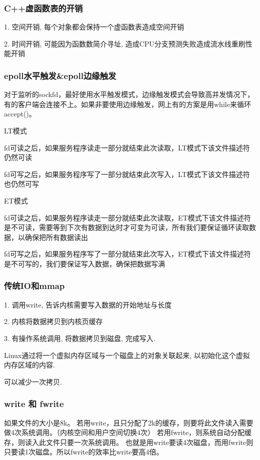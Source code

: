 \subsubsection{C++虚函数表的开销}
1. 空间开销, 每个对象都会保持一个虚函数表造成空间开销 \par
2. 时间开销, 可能因为函数数简介寻址, 造成CPU分支预测失败造成流水线重刷性能开销 \par
\subsubsection{epoll水平触发\&epoll边缘触发}
对于监听的sockfd，最好使用水平触发模式，边缘触发模式会导致高并发情况下，有的客户端会连接不上。如果非要使用边缘触发，网上有的方案是用while来循环accept()。 \par
LT模式 \par
fd可读之后，如果服务程序读走一部分就结束此次读取，LT模式下该文件描述符仍然可读\par
fd可写之后，如果服务程序写了一部分就结束此次写入，LT模式下该文件描述符也仍然可写\par
ET模式 \par
fd可读之后，如果服务程序读走一部分就结束此次读取，ET模式下该文件描述符是不可读，需要等到下次有数据到达时才可变为可读，所有我们要保证循环读取数据，以确保把所有数据读出 \par
fd可写之后，如果服务程序写了一部分就结束此次写入，ET模式下该文件描述符是不可写的，我们要保证写入数据，确保把数据写满 \par
\subsubsection{传统IO和mmap}
1. 调用write, 告诉内核需要写入数据的开始地址与长度 \par
2. 内核将数据拷贝到内核页缓存 \par
3. 有操作系统调用, 将数据拷贝到磁盘, 完成写入. \par
Linux通过将一个虚拟内存区域与一个磁盘上的对象关联起来, 以初始化这个虚拟内存区域的内容. \par
可以减少一次拷贝.

\subsubsection{write 和 fwrite}
如果文件的大小是8k。
若用write，且只分配了2k的缓存，则要将此文件读入需要做4次系统调用。（内核空间和用户空间切换4次）
若用fwrite，则系统自动分配缓存，则读入此文件只要一次系统调用。
也就是用write要读4次磁盘，而用fwrite则只要读1次磁盘。所以fwrite的效率比write要高4倍。